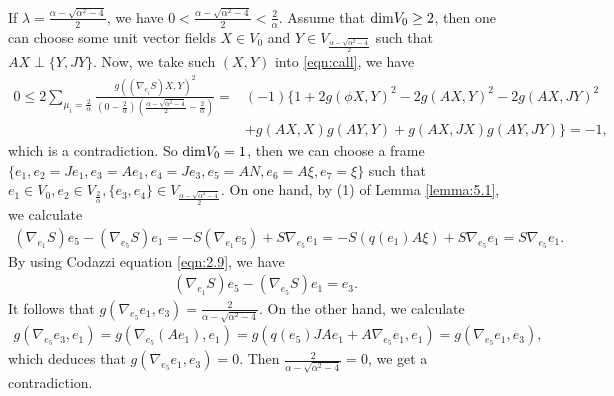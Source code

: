 \documentclass[reqno]{amsart}%
\theoremstyle{definition}
\numberwithin{equation}{section}
\begin{document}
If $\lambda=\frac{\alpha-\sqrt{\alpha^2-4}}{2}$,
we have $0<\frac{\alpha-\sqrt{\alpha^2-4}}{2}<\frac{2}{\alpha}$.
Assume that ${\rm dim}V_0\geq2$, then one can choose some unit vector fields $X\in V_0$ and $Y\in V_{\frac{\alpha-\sqrt{\alpha^2-4}}{2}}$ such that $AX\perp \{Y,JY\}$. Now, we take such $(X,Y)$
into \eqref{eqn:call}, we have
%
\begin{equation*}
\begin{aligned}
0\leq2\sum_{\mu_i=\frac{2}{\alpha}}\frac{g((\nabla_{e_i} S)X,Y)^2}{(0-\frac{2}{\alpha})(\frac{\alpha-\sqrt{\alpha^2-4}}{2}-\frac{2}{\alpha})}
=&(-1)\Big\{1+2g(\phi X,Y)^2-2g(AX,Y)^2-2g(AX,JY)^2\\
&  +g(AX,X)g(AY,Y)+g(AX,JX)g(AY,JY)\Big\}=-1,
\end{aligned}
\end{equation*}
which is a contradiction. So ${\rm dim}V_0=1$, then we can choose a frame $\{e_1,e_2=Je_1,e_3=Ae_1,e_4=Je_3,e_5=AN,e_6=A\xi,e_7=\xi\}$ such that $e_1\in V_0,e_2\in V_{\frac{2}{\alpha}},\{e_3,e_4\}\in V_{\frac{\alpha-\sqrt{\alpha^2-4}}{2}}$.
On one hand, by (1) of Lemma \ref{lemma:5.1}, we calculate
$$
\begin{aligned}
(\nabla_{e_1} S){e_5}-(\nabla_{e_5} S){e_1}=-S(\nabla_{e_1}{e_5})+S\nabla_{e_5}{e_1}
=-S(q(e_1)A\xi)+S\nabla_{e_5}{e_1}=S\nabla_{e_5}{e_1}.
\end{aligned}
$$
By using Codazzi equation \eqref{eqn:2.9}, we have
$$
\begin{aligned}
&(\nabla_{e_1} S){e_5}-(\nabla_{e_5} S){e_1}=e_3.
\end{aligned}
$$
It follows that
$g(\nabla_{e_5}{e_1},e_3)=\frac{2}{\alpha-\sqrt{\alpha^2-4}}$.
On the other hand, we calculate
$$
\begin{aligned}
g(\nabla_{e_5}{e_3},e_1)=g(\nabla_{e_5}(Ae_1),e_1)=g(q(e_5)JAe_1+A\nabla_{e_5}{e_1},e_1)
=g(\nabla_{e_5}{e_1},e_3),
\end{aligned}
$$
which deduces that $g(\nabla_{e_5}{e_1},e_3)=0$. Then $\frac{2}{\alpha-\sqrt{\alpha^2-4}}=0$,
we get a contradiction.
\end{document}
